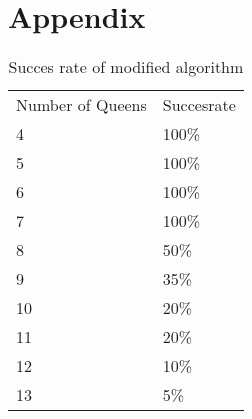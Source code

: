 \documentclass{article}
\begin{document}
	\section{Appendix}
\begin{table}[H]
\centering
\caption{Succes rate of modified algorithm}
\label{my-label}
\begin{tabular}{ll}
Number of Queens & Succesrate \\
4                & 100\%      \\
5                & 100\%      \\
6                & 100\%      \\
7                & 100\%      \\
8                & 50\%       \\
9                & 35\%       \\
10               & 20\%       \\
11               & 20\%       \\
12               & 10\%       \\
13               & 5\%       
\end{tabular}
\end{table}
		
\end{document}
